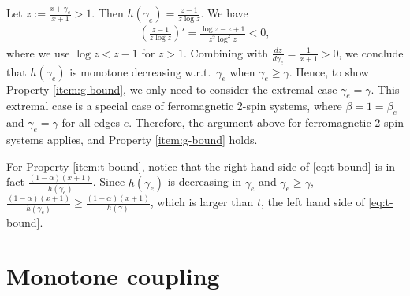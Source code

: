 \documentclass[11pt]{amsart}
\newcommand{\defeq}{:=}
\theoremstyle{definition}
\theoremstyle{remark}
\begin{document}
Let $z\defeq\frac{x+\gamma_e}{x+1}>1$. Then $h(\gamma_e)=\frac{z-1}{z\log z}$. We have 
\begin{align*}
    \left(\frac{z-1}{z\log z}\right)'= \frac{\log z -z +1}{z^2 \log^2 z} < 0, 
\end{align*}
where we use $\log z < z-1$ for $z>1$. Combining with $\frac{d z}{d \gamma_e}=\frac{1}{x+1}>0$, we conclude that $h(\gamma_e)$ is monotone decreasing w.r.t.\ $\gamma_e$ when $\gamma_e\geq \gamma$. 
Hence, to show Property \eqref{item:g-bound}, 
we only need to consider the extremal case $\gamma_e=\gamma$. 
This extremal case is a special case of ferromagnetic 2-spin systems, where $\beta=1=\beta_e$ and $\gamma_e=\gamma$ for all edges $e$. 
Therefore, the argument above for ferromagnetic 2-spin systems applies, and Property \eqref{item:g-bound} holds. 

For Property \eqref{item:t-bound},
notice that the right hand side of \eqref{eq:t-bound} is in fact $\frac{(1-\alpha)(x+1)}{h(\gamma_e)}$.
Since $h(\gamma_e)$ is decreasing in $\gamma_e$ and $\gamma_e\ge \gamma$,
$\frac{(1-\alpha)(x+1)}{h(\gamma_e)} \ge \frac{(1-\alpha)(x+1)}{h(\gamma)}$,
which is larger than $t$, the left hand side of \eqref{eq:t-bound}.

\section{Monotone coupling}\label{app:censoring}
\end{document}
